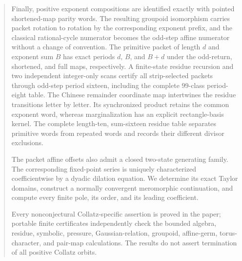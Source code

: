 \documentclass[11pt,letterpaper]{article}
\theoremstyle{definition}
\theoremstyle{remark}
\begin{document}
\begin{abstract}
Finally, positive exponent compositions are identified exactly with pointed
shortened-map parity words.  The resulting groupoid isomorphism carries packet
rotation to rotation by the corresponding exponent prefix, and the classical
rational-cycle numerator becomes the odd-step affine numerator without a
change of convention.  The primitive packet of length $d$ and exponent sum
$B$ has exact periods $d$, $B$, and $B+d$ under the odd-return, shortened,
and full maps, respectively.  A finite-state residue recursion and two independent
integer-only scans certify all strip-selected packets through odd-step period
sixteen, including the complete $99$-class period-eight table.
The Chinese remainder coordinate map intertwines the residue transitions
letter by letter.  Its synchronized product retains the common exponent
word, whereas marginalization has an explicit rectangle-basis kernel.
The complete length-ten, sum-sixteen residue table separates primitive
words from repeated words and records their different divisor exclusions.

The packet affine offsets also admit a closed two-state generating family.
The corresponding fixed-point series is uniquely characterized
coefficientwise by a dyadic dilation equation.  We determine its exact
Taylor domains, construct a normally convergent meromorphic continuation,
and compute every finite pole, its order, and its leading coefficient.

Every nonconjectural Collatz-specific assertion is proved in the paper;
portable finite certificates independently check the bounded algebra,
residue, symbolic, pressure, Gaussian-relation, groupoid, affine-germ,
torus-character, and pair-map calculations.  The results do not assert
termination of all positive Collatz orbits.
\end{abstract}

\tableofcontents







\end{document}
